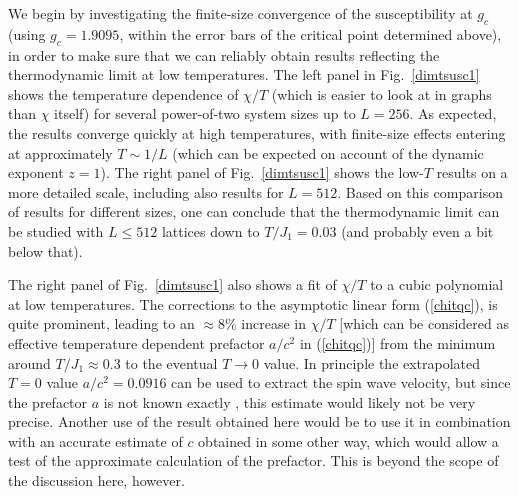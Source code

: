 \documentclass[draft,numberedheadings]{aipproc}
\begin{document}
We begin by investigating the finite-size convergence of the susceptibility at $g_c$ (using $g_c=1.9095$, within the error bars of the critical
point determined above), in order to make sure that we can reliably obtain results reflecting the thermodynamic limit at low temperatures. The left panel
in Fig.~\ref{dimtsusc1} shows the temperature dependence of $\chi/T$ (which is easier to look at in graphs than $\chi$ itself) for several power-of-two 
system sizes up to $L=256$. As expected, the results converge quickly at high temperatures, with finite-size effects entering at approximately 
$T \sim 1/L$ (which can be expected on account of the dynamic exponent $z=1$). The right panel of Fig.~\ref{dimtsusc1} shows the low-$T$ results 
on a more detailed scale, including also results for $L=512$. Based on this comparison of results for different sizes, one can conclude that the 
thermodynamic limit can be studied with $L\le 512$ lattices down to $T/J_1=0.03$ (and probably even a bit below that).

The right panel of Fig.~\ref{dimtsusc1} also shows a fit of $\chi/T$ to a cubic polynomial at low temperatures. The corrections to the asymptotic linear 
form (\ref{chitqc}), is quite prominent, leading to an $\approx 8\%$ increase in $\chi/T$ [which can be considered as effective temperature dependent 
prefactor $a/c^2$ in (\ref{chitqc})] from the minimum around $T/J_1\approx 0.3$ to the eventual $T\to 0$ value. In principle the extrapolated $T=0$ value
$a/c^2=0.0916$ can be used to extract the spin wave velocity, but since the prefactor $a$ is not known exactly \cite{chubukov}, this estimate would likely
not be very precise. Another use of the result obtained here would be to use it in combination with an accurate estimate of $c$ obtained in some other
way, which would allow a test of the approximate calculation \cite{chubukov} of the prefactor. This is beyond the scope of the discussion here, however.
\end{document}

